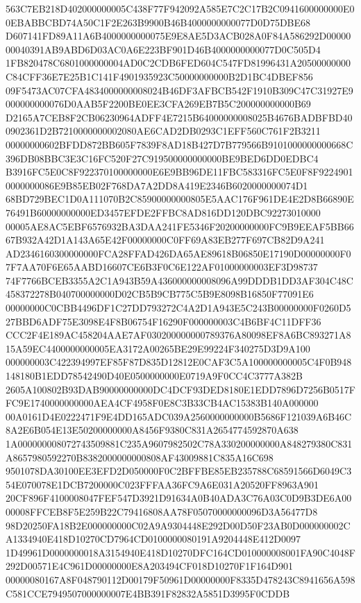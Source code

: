\documentclass[UTF8,fontset=fandol,zihao=-4,a4paper]{ctexart}
\begin{document}
{{563C7EB218D402000000005C438F77F942092A585E7C2C17B2C0941600000000E00EBABBCBD74A50C1F2E263B9900B46B4000000000077D0D75DBE68
D607141FD89A11A6B4000000000075E9E8AE5D3ACB028A0F84A586292D0000000040391AB9ABD6D03AC0A6E223BF901D46B4000000000077D0C505D4
1FB820478C6801000000004AD0C2CDB6FED604C547FD81996431A20500000000C84CFF36E7E25B1C141F4901935923C50000000000B2D1BC4DBEF856
09F5473AC07CFA4834000000008024B46DF3AFBCB542F1910B309C47C31927E9000000000076D0AAB5F2200BE0EE3CFA269EB7B5C200000000000B69
D2165A7CEB8F2CB06230964ADFF4E7215B64000000008025B4676BADBFBD400902361D2B7210000000002080AE6CAD2DB0293C1EFF560C761F2B3211
00000000602BFDD872BB605F7839F8AD18B427D7B779566B9101000000000668C396DB08BBC3E3C16FC520F27C919500000000000BE9BED6DD0EDBC4
B3916FC5E0C8F922370100000000E6E9BB96DE11FBC583316FC5E0F8F92249010000000086E9B85EB02F768DA7A2DD8A419E2346B6020000000074D1
68BD729BEC1D0A111070B2C85900000000805E5AAC176F961DE4E2D8B66890E76491B60000000000ED3457EFDE2FFBC8AD816DD120DBC92273010000
00005AE8AC5EBF6576932BA3DAA241FE5346F20200000000FC9B9EEAF5BB6667B932A42D1A143A65E42F00000000C0FF69A83EB277F697CB82D9A241
AD2346160300000000FCA28FFAD426DA65AE89618B06850E17190D00000000F07F7AA70F6E65AABD16607CE6B3F0C6E122AF01000000003EF3D98737
74F7766BCEB3355A2C1A943B59A436000000008096A99DDDB1DD3AF304C48C458372278B040700000000D02CB5B9CB775C5B9E8098B16850F77091E6
00000000C0CBB4496DF1C27DD793272C4A2D1A943E5C243B00000000F0260D527BBD6ADF75E3098E4F8B06754F16290F000000003C4B6BF4C11DFF36
CCC2F4E189AC458204AAE7AF030200000000789376A80098EF8A6BC893271A815A59EC4400000000005EA3172A00265BE29E99224F340275D3D9A100
000000003C422394997EF85F87D835D12812E0CAF3C5A100000000005C4F0B948148180B1EDD78542490D40E0500000000E0719A9F0CC4C3777A382B
2605A100802B93DAB90000000000DC4DCF93DED8180E1EDD7896D7256B0517FFC9E1740000000000AEA4CF4958F0E8C3B33CB4AC15383B140A000000
00A0161D4E0222471F9E4DD165ADC039A2560000000000B5686F121039A6B46C8A2E6B054E13E50200000000A8456F9380C831A2654774592870A638
1A000000008072743509881C235A9607982502C78A330200000000A848279380C831A8657980592270B8382000000000808AF43009881C835A16C698
9501078DA30100EE3EFD2D050000F0C2BFFBE85EB235788C68591566D6049C354E070078E1DCB7200000C023FFFAA36FC9A6E031A20520FF8963A901
20CF896F4100008047FEF547D3921D91634A0B40ADA3C76A03C0D9B3DE6A0000008FFCEB8F5E259B22C79416808AA78F05070000000096D3A56477D8
98D20250FA18B2E000000000C02A9A9304448E292D00D50F23AB0D000000002CA1334940E418D10270CD7964CD0100000080191A9204448E412D0097
1D49961D0000000018A3154940E418D10270DFC164CD010000008001FA90C4048F292D00571E4C961D00000000E8A203494CF018D10270F1F164D901
00000080167A8F048790112D00179F50961D00000000F8335D478243C8941656A598C581CCE7949507000000007E4BB391F82832A5851D3995F0CDDB
}}
\end{document}
